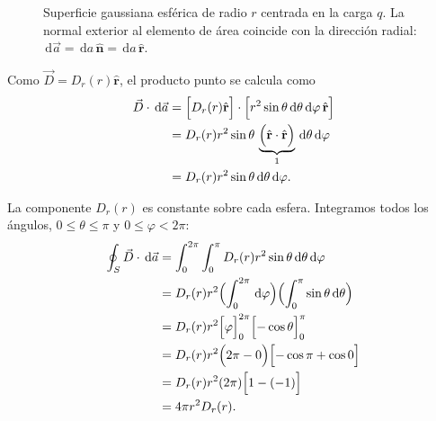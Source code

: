 \documentclass[11pt]{article}
\newcommand{\er}{\hat{\mathbf r}}
\newcommand{\dd}{\,\mathrm d}
\begin{document}
\begin{figure}[H]
\caption{Superficie gaussiana esférica de radio $r$ centrada en
la carga $q$. La normal exterior al elemento de área coincide
con la dirección radial:
$\dd\vec a=\dd a\,\hat{\mathbf n}=\dd a\,\er$.}
\label{fig:normal_gaussiana}
\end{figure}

Como $\vec D=D_r(r)\er$, el producto punto se calcula como
\begin{align*}
  \vec D\cdot\dd\vec a
    &=\Bigl[D_r(r)\er\Bigr]
      \cdot
      \Bigl[r^2\sin\theta\dd\theta\dd\varphi\,\er\Bigr]\\
    &=D_r(r)r^2\sin\theta\,
      \underbrace{\Bigl(\er\cdot\er\Bigr)}_{1}
      \dd\theta\dd\varphi\\
    &=D_r(r)r^2\sin\theta\dd\theta\dd\varphi.
\end{align*}

La componente $D_r(r)$ es constante sobre cada esfera.
Integramos todos los ángulos,
$0\leq\theta\leq\pi$ y $0\leq\varphi<2\pi$:
\begin{align*}
  \oint_S\vec D\cdot\dd\vec a
    &=\int_0^{2\pi}\int_0^\pi
      D_r(r)r^2\sin\theta\dd\theta\dd\varphi\\
    &=D_r(r)r^2
      \Bigl(\int_0^{2\pi}\dd\varphi\Bigr)
      \Bigl(\int_0^\pi\sin\theta\dd\theta\Bigr)\\
    &=D_r(r)r^2
      \Bigl[\varphi\Bigr]_0^{2\pi}
      \Bigl[-\cos\theta\Bigr]_0^\pi\\
    &=D_r(r)r^2
      \Bigl(2\pi-0\Bigr)
      \Bigl[-\cos\pi+\cos0\Bigr]\\
    &=D_r(r)r^2(2\pi)
      \Bigl[1-(-1)\Bigr]\\
    &=4\pi r^2D_r(r).
\end{align*}
\end{document}
